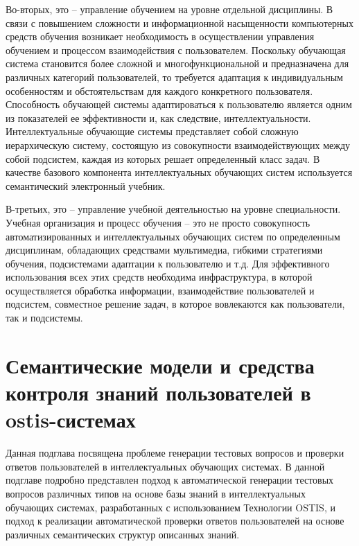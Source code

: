 Во-вторых, это -- управление обучением на уровне отдельной дисциплины. В связи с повышением сложности и информационной насыщенности компьютерных средств обучения возникает необходимость в осуществлении управления обучением и процессом взаимодействия с пользователем. Поскольку обучающая система становится более сложной и многофункциональной и предназначена для различных категорий пользователей, то требуется адаптация к индивидуальным особенностям и обстоятельствам для каждого конкретного пользователя. Способность обучающей системы адаптироваться к пользователю является одним из показателей ее эффективности и, как следствие, интеллектуальности. Интеллектуальные обучающие системы представляет собой сложную иерархическую систему, состоящую из совокупности взаимодействующих между собой подсистем, каждая из которых решает определенный класс задач. В качестве базового компонента интеллектуальных обучающих систем используется семантический электронный учебник.

В-третьих, это -- управление учебной деятельностью на уровне специальности. Учебная организация и процесс обучения -- это не просто совокупность автоматизированных и интеллектуальных обучающих систем по определенным дисциплинам, обладающих средствами мультимедиа, гибкими стратегиями обучения, подсистемами адаптации к пользователю и т.д. Для эффективного использования всех этих средств необходима инфраструктура, в которой осуществляется обработка информации, взаимодействие пользователей и подсистем, совместное решение задач, в которое вовлекаются как пользователи, так и подсистемы.

\section{Семантические модели и средства контроля знаний пользователей в ostis-системах}

Данная подглава посвящена проблеме генерации тестовых вопросов и проверки ответов пользователей в интеллектуальных обучающих системах. В данной подглаве подробно представлен подход к автоматической генерации тестовых вопросов различных типов на основе базы знаний в интеллектуальных обучающих системах, разработанных с использованием Технологии OSTIS, и подход к реализации автоматической проверки ответов пользователей на основе различных семантических структур описанных знаний.




